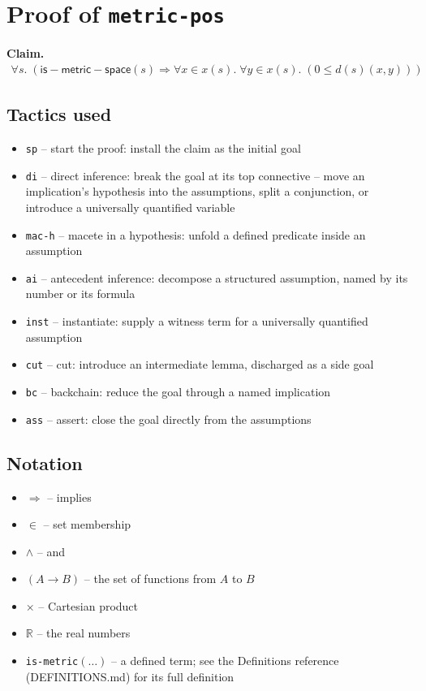 \documentclass[11pt]{article}
\begin{document}
\section*{Proof of \texttt{metric-pos}}
\textbf{Claim.}
\begin{align*}
  \forall s.\; (\mathsf{is{-}metric{-}space}(s) \Rightarrow \forall x \in x(s).\; \forall y \in x(s).\; (0 \leq d(s)(x, y)))
\end{align*}
\bigskip

\subsection*{Tactics used}
\begin{itemize}
\item \texttt{sp} -- start the proof: install the claim as the initial goal
\item \texttt{di} -- direct inference: break the goal at its top connective -- move an implication's hypothesis into the assumptions, split a conjunction, or introduce a universally quantified variable
\item \texttt{mac-h} -- macete in a hypothesis: unfold a defined predicate inside an assumption
\item \texttt{ai} -- antecedent inference: decompose a structured assumption, named by its number or its formula
\item \texttt{inst} -- instantiate: supply a witness term for a universally quantified assumption
\item \texttt{cut} -- cut: introduce an intermediate lemma, discharged as a side goal
\item \texttt{bc} -- backchain: reduce the goal through a named implication
\item \texttt{ass} -- assert: close the goal directly from the assumptions
\end{itemize}

\subsection*{Notation}
\begin{itemize}
\item $\Rightarrow$ -- implies
\item $\in$ -- set membership
\item $\wedge$ -- and
\item $(A \to B)$ -- the set of functions from $A$ to $B$
\item $\times$ -- Cartesian product
\item $\mathbb{R}$ -- the real numbers
\item \texttt{is-metric}$(\ldots)$ -- a defined term; see the Definitions reference (DEFINITIONS.md) for its full definition
\end{itemize}
\end{document}
